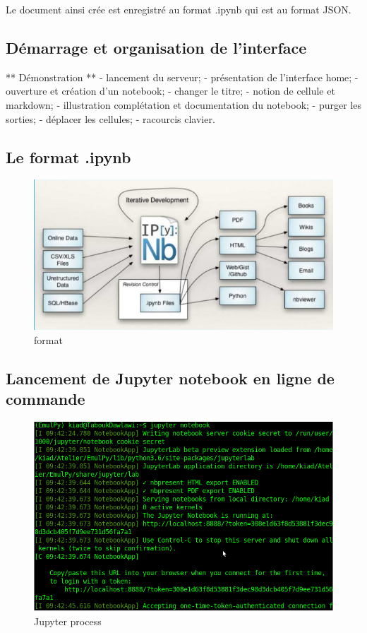 \documentclass[11pt]{article}
\makeatletter
\def\maxwidth{\ifdim\Gin@nat@width>\linewidth\linewidth
    \else\Gin@nat@width\fi}
\let\Oldincludegraphics\includegraphics
\renewcommand{\includegraphics}[1]{\Oldincludegraphics[width=.8\maxwidth]{#1}}
\makeatother
\begin{document}
Le document ainsi crée est enregistré au format .ipynb qui est au format
JSON.

    \subsection{Démarrage et organisation de
l'interface}\label{duxe9marrage-et-organisation-de-linterface}

** Démonstration ** - lancement du serveur; - présentation de
l'interface home; - ouverture et création d'un notebook; - changer le
titre; - notion de cellule et markdown; - illustration complétation et
documentation du notebook; - purger les sorties; - déplacer les
cellules; - racourcis clavier.

    \subsection{Le format .ipynb}\label{le-format-.ipynb}

\begin{figure}
\centering
\includegraphics{images/IPython_Notebook_Workflows.png}
\caption{format}
\end{figure}

    \subsection{Lancement de Jupyter notebook en ligne de
commande}\label{lancement-de-jupyter-notebook-en-ligne-de-commande}

\begin{figure}
\centering
\includegraphics{images/jupyternotebook_run.png}
\caption{Jupyter process}
\end{figure}
\end{document}
